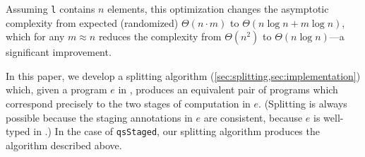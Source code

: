 \begin{abstrsyn}
Assuming \texttt{l} contains $n$ elements, this optimization changes the
asymptotic complexity from expected (randomized) $\Theta(n \cdot m)$ to
$\Theta(n\log{n} + m\log{n})$, which for any $m \approx n$ reduces the
complexity from $\Theta (n^2)$ to $\Theta(n\log{n})$---a significant improvement. 

In this paper, we develop a splitting algorithm
(\ref{sec:splitting,sec:implementation}) which, given a program $e$ in \lang,
produces an equivalent pair of programs which correspond precisely to the two
stages of computation in $e$.
(Splitting is always possible because the staging annotations in $e$ are
consistent, because $e$ is well-typed in \lang.) In the case of
\texttt{qsStaged}, our splitting algorithm produces the algorithm described
above.






\end{abstrsyn}
